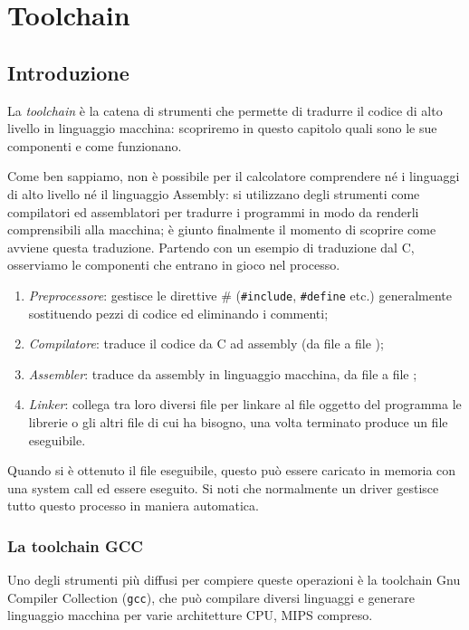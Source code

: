 \documentclass[class=book, crop=false, oneside]{standalone}
\begin{document}
\chapter{Toolchain}\label{ch:tool}

\section{Introduzione}
La \emph{toolchain} è la catena di strumenti che permette di tradurre il codice di alto livello in linguaggio macchina: scopriremo in questo capitolo quali sono le sue componenti e come funzionano.

Come ben sappiamo, non è possibile per il calcolatore comprendere né i linguaggi di alto livello né il linguaggio Assembly: si utilizzano degli strumenti come compilatori ed assemblatori per tradurre i programmi in modo da renderli comprensibili alla macchina; è giunto finalmente il momento di scoprire come avviene questa traduzione. Partendo con un esempio di traduzione dal C, osserviamo le componenti che entrano in gioco nel processo.
\begin{enumerate}
	\item \emph{Preprocessore}: gestisce le direttive \# (\texttt{#include}, \texttt{#define} etc.) generalmente sostituendo pezzi di codice ed eliminando i commenti;
	\item \emph{Compilatore}: traduce il codice da C ad assembly (da file  a file );
	\item \emph{Assembler}: traduce da assembly in linguaggio macchina, da file  a file ;
	\item \emph{Linker}: collega tra loro diversi file  per linkare al file oggetto del programma le librerie o gli altri file  di cui ha bisogno, una volta terminato produce un file eseguibile.
\end{enumerate}
Quando si è ottenuto il file eseguibile, questo può essere caricato in memoria con una system call ed essere eseguito. Si noti che normalmente un driver gestisce tutto questo processo in maniera automatica.

\subsection*{La toolchain GCC}
Uno degli strumenti più diffusi per compiere queste operazioni è la toolchain Gnu Compiler Collection (\texttt{gcc}), che può compilare diversi linguaggi e generare linguaggio macchina per varie architetture CPU, MIPS compreso.
\end{document}
